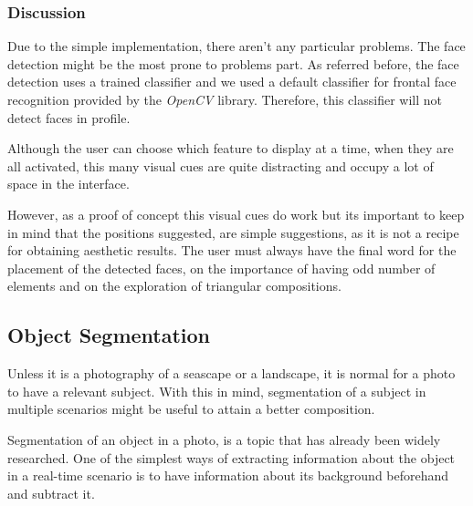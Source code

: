 \subsubsection{Discussion}

Due to the simple implementation, there aren't any particular problems. The face detection might be the most prone to problems part. As referred before, the face detection uses a trained classifier and we used a default classifier for frontal face recognition provided by the \emph{OpenCV} library. Therefore, this classifier will not detect faces in profile.

Although the user can choose which feature to display at a time, when they are all activated, this many visual cues are quite distracting and occupy a lot of space in the interface.

However, as a proof of concept this visual cues do work but its important to keep in mind that the positions suggested, are simple suggestions, as it is not a recipe for obtaining aesthetic results. The user must always have the final word for the placement of the detected faces, on the importance of having odd number of elements and on the exploration of triangular compositions.

\subsection{Object Segmentation}
\label{sub:segmentation}

Unless it is a photography of a seascape or a landscape, it is normal for a photo to have a relevant subject. With this in mind, segmentation of a subject in multiple scenarios might be useful to attain a better composition.

Segmentation of an object in a photo, is a topic that has already been widely researched. One of the simplest ways of extracting information about the object in a real-time scenario is to have information about its background beforehand and subtract it. 

